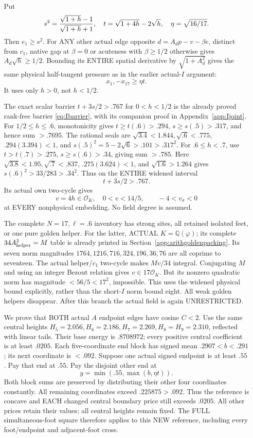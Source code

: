 \documentclass[11pt]{article}
\begin{document}
Put
\[
 s^2={\sqrt{1+h}-1\over\sqrt{1+h}+1},\quad
 t=\sqrt{1+4h}-2\sqrt h,\quad\eta=\sqrt{16/17}.
\]
Then \(e_1\ge s^2\).
For ANY other actual edge opposite
\(d=A_dp-v-\beta e\), distinct from
\(c_1\), native gap at \(\beta=0\) or
acuteness with \(\beta\ge1/2\) otherwise
gives \(A_d\sqrt h\ge1/2\).
Bounding its ENTIRE spatial derivative by
\(\sqrt{1+A_d^2}\) gives the same physical
half-tangent pressure as in the earlier
actual-\(I\) argument:
\[
                       x_1,-x_{17}\ge\eta t .
\]
It uses only \(h>0\), not \(h<1/2\).

The exact scalar barrier \(t+3s/2>.767\)
for \(0<h<1/2\) is the already proved
rank-free barrier \eqref{eq:Ibarrier},
with its companion proof in Appendix~\ref{app:Ijoint}.
For \(1/2\le h\le.6\), monotonicity gives
\(t\ge t(.6)>.294\), \(s\ge s(.5)>.317\),
and hence sum \(>.7695\).
The rational seals are
\(\sqrt{3.4}<1.844,\sqrt{.6}<.775\),
\(.294(3.394)<1\), and
\(s(.5)^2=5-2\sqrt6>.101>.317^2\).
For \(.6\le h<.7\), use
\(t>t(.7)>.275\), \(s\ge s(.6)>.34\),
giving sum \(>.785\).
Here
\(\sqrt{3.8}<1.95,\sqrt{.7}<.837\),
\(.275(3.624)<1\), and
\(\sqrt{1.6}>1.264\) gives
\(s(.6)^2>33/283>.34^2\).
Thus on the ENTIRE widened interval
\[
                              t+3s/2>.767 .
\]
Its actual own two-cycle gives
\[
 v=4h\in\mathcal O_K,\quad0<v<14/5,\qquad
                        -4<v_\sigma<0
\]
at EVERY nonphysical embedding.
No field degree is assumed.

The complete \(N=17,\ell=.6\) inventory
has strong sites, all retained isolated
feet, or one pure golden helper.
For the latter, ACTUAL \(K=\mathbb Q(\varphi)\);
its complete \(34A_{\rm helper}^2=M\)
table is already printed in
Section~\ref{app:arithgoldenpacking}.
Its seven norm magnitudes
\(1764,1216,716,324,196,36,76\) are
all coprime to seventeen.
The actual helper/\(c_1\) two-cycle
makes \(Mv/34\) integral.
Conjugating \(M\) and using an integer
Bezout relation gives \(v\in17\mathcal O_K\).
But its nonzero quadratic norm has magnitude
\(<56/5<17^2\), impossible.
This uses the widened physical bound
explicitly, rather than the short-\(I\)
norm bound eight.
All weak golden helpers disappear.
After this branch the actual field is
again UNRESTRICTED.

We prove that BOTH actual \(A\) endpoint
edges have cosine \(C<2\).
Use the same central heights
\(H_5=2.056,H_6=2.186,H_7=2.269,H_8=H_9=2.310\),
reflected with linear tails.
Their base energy is \(.8708972\);
every positive central coefficient is
at least \(.0205\).
Each five-coordinate end block has signed
mean \(.2907<b<.291\); its next coordinate
is \(<.092\).
Suppose one actual signed endpoint is
at least \(.55\).
Pay that end at \(.55\).
Pay the disjoint other end at
\[
                         y=\min(.55,\max(b,\eta t)).
\]
Both block sums are preserved by distributing
their other four coordinates constantly.
All remaining coordinates exceed
\(.225875>.092\).
Thus the reference is concave and EACH
changed central boundary price still
exceeds \(.0205\).
All other prices retain their values;
all central heights remain fixed.
The FULL simultaneous-foot square therefore
applies to this NEW reference, including
every foot/endpoint and adjacent-foot cross.
\end{document}
